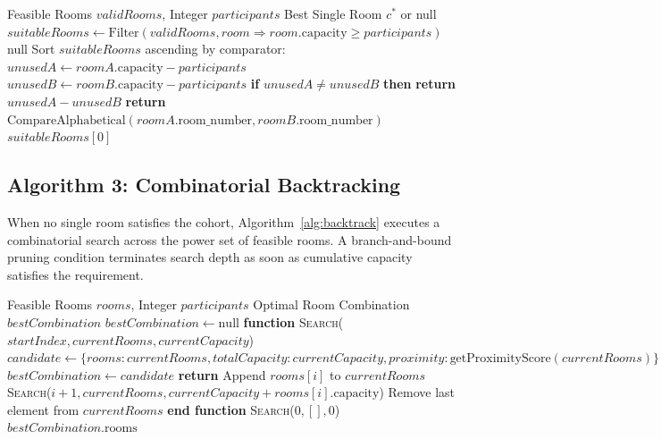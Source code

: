 \documentclass[conference]{IEEEtran}
\begin{document}
\begin{algorithm}[t]
\caption{Best-Fit Room Selection (\texttt{selectBestSingleRoom})}
\label{alg:best_fit}
\begin{algorithmic}[1]
\REQUIRE Feasible Rooms $validRooms$, Integer $participants$
\ENSURE Best Single Room $c^*$ or null
\STATE $suitableRooms \leftarrow \text{Filter}(validRooms, room \Rightarrow room.\text{capacity} \ge participants)$
    \RETURN null
\ENDIF
\STATE Sort $suitableRooms$ ascending by comparator:
\STATE \hspace{1em} $unusedA \leftarrow roomA.\text{capacity} - participants$
\STATE \hspace{1em} $unusedB \leftarrow roomB.\text{capacity} - participants$
\STATE \hspace{1em} \textbf{if} $unusedA \ne unusedB$ \textbf{then} \textbf{return} $unusedA - unusedB$
\STATE \hspace{1em} \textbf{return} $\text{CompareAlphabetical}(roomA.\text{room\_number}, roomB.\text{room\_number})$
\RETURN $suitableRooms[0]$
\end{algorithmic}
\end{algorithm}

\subsection{Algorithm 3: Combinatorial Backtracking}
When no single room satisfies the cohort, Algorithm~\ref{alg:backtrack} executes a combinatorial search across the power set of feasible rooms. A branch-and-bound pruning condition terminates search depth as soon as cumulative capacity satisfies the requirement.

\begin{algorithm}[t]
\caption{Combinatorial Backtracking (\texttt{findBestRoomCombination})}
\label{alg:backtrack}
\begin{algorithmic}[1]
\REQUIRE Feasible Rooms $rooms$, Integer $participants$
\ENSURE Optimal Room Combination $bestCombination$
\STATE $bestCombination \leftarrow \text{null}$
\STATE \textbf{function} \textsc{Search}($startIndex, currentRooms, currentCapacity$)
    \STATE $candidate \leftarrow \{ rooms: currentRooms, totalCapacity: currentCapacity, proximity: \text{getProximityScore}(currentRooms) \}$
        \STATE $bestCombination \leftarrow candidate$
    \ENDIF
    \STATE \textbf{return} 
\ENDIF
{}
    \STATE Append $rooms[i]$ to $currentRooms$
    \STATE \textsc{Search}($i + 1, currentRooms, currentCapacity + rooms[i].\text{capacity}$)
    \STATE Remove last element from $currentRooms$ 
\ENDFOR
\STATE \textbf{end function}
\STATE \textsc{Search}($0, [], 0$)
\RETURN $bestCombination.\text{rooms}$
\end{algorithmic}
\end{algorithm}
\end{document}
